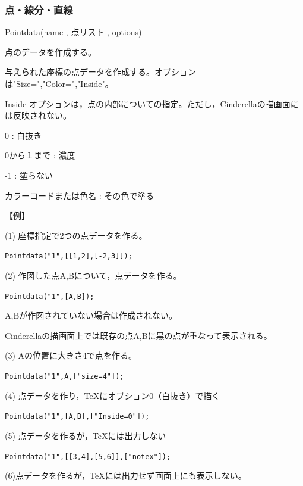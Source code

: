 \documentclass[papersize,a4paper,12pt,uplatex]{jsarticle}
\begin{document}
\subsubsection{点・線分・直線}
\begin{description}

\vspace{\baselineskip}
\hypertarget{pointdata}{}
\item[関数]Pointdata(name , 点リスト , options)
\item[機能]点のデータを作成する。
\item[説明]与えられた座標の点データを作成する。オプションは"Size=","Color=","Inside"。

Inside オプションは，点の内部についての指定。ただし，Cinderellaの描画面には反映されない。

0 : 白抜き

0から１まで : 濃度

-1 : 塗らない

カラーコードまたは色名 : その色で塗る

\vspace{\baselineskip}
【例】

(1) 座標指定で2つの点データを作る。

\hspace{10mm} \verb|Pointdata("1",[[1,2],[-2,3]]);|

(2) 作図した点A,Bについて，点データを作る。

\hspace{10mm} \verb|Pointdata("1",[A,B]);|

\hspace{5mm}A,Bが作図されていない場合は作成されない。

\hspace{5mm}Cinderellaの描画面上では既存の点A,Bに黒の点が重なって表示される。

(3) Aの位置に大きさ4で点を作る。

\hspace{10mm} \verb|Pointdata("1",A,["size=4"]);|

(4) 点データを作り，TeXにオプション0（白抜き）で描く

\hspace{10mm}\verb|Pointdata("1",[A,B],["Inside=0"]);|

(5) 点データを作るが，TeXには出力しない

\hspace{10mm}\verb|Pointdata("1",[[3,4],[5,6]],["notex"]);|

(6)点データを作るが，TeXには出力せず画面上にも表示しない。


\end{description}
\end{document}
